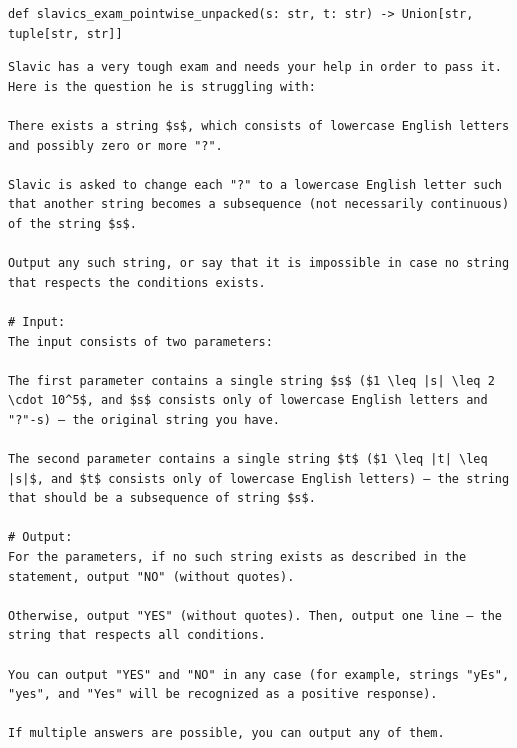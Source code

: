 \documentclass[acmsmall,screen,nonacm]{acmart}
\begin{document}
{\scriptsize
\begin{tcolorbox}[mybox,breakable,title={Transformed pointwise problem}]
\begin{verbatim}
def slavics_exam_pointwise_unpacked(s: str, t: str) -> Union[str, tuple[str, str]]
\end{verbatim}
\begin{verbatim}
Slavic has a very tough exam and needs your help in order to pass it. Here is the question he is struggling with:

There exists a string $s$, which consists of lowercase English letters and possibly zero or more "?".

Slavic is asked to change each "?" to a lowercase English letter such that another string becomes a subsequence (not necessarily continuous) of the string $s$.

Output any such string, or say that it is impossible in case no string that respects the conditions exists.

# Input:
The input consists of two parameters:

The first parameter contains a single string $s$ ($1 \leq |s| \leq 2 \cdot 10^5$, and $s$ consists only of lowercase English letters and "?"-s) — the original string you have.

The second parameter contains a single string $t$ ($1 \leq |t| \leq |s|$, and $t$ consists only of lowercase English letters) — the string that should be a subsequence of string $s$.

# Output:
For the parameters, if no such string exists as described in the statement, output "NO" (without quotes).

Otherwise, output "YES" (without quotes). Then, output one line — the string that respects all conditions.

You can output "YES" and "NO" in any case (for example, strings "yEs", "yes", and "Yes" will be recognized as a positive response).

If multiple answers are possible, you can output any of them.
\end{verbatim}
\end{tcolorbox}
}
\end{document}
